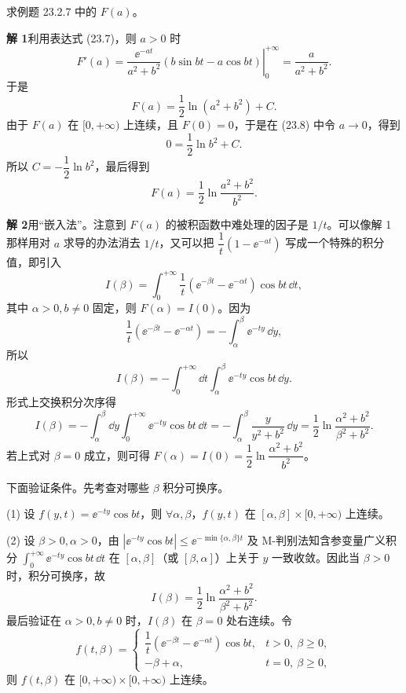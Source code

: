 \begin{xexample}[23.2.8]
求例题 23.2.7 中的 $F(a)$。
\end{xexample}
\begin{xsolution}
\textbf{解 1}\quad 利用表达式 (23.7)，则 $a>0$ 时
\[
  F'(a)=\left.\frac{\ee^{-at}}{a^2+b^2}(b\sin bt-a\cos bt)\right|_0^{+\infty}
  =\frac{a}{a^2+b^2}.
\]
于是
\begin{equation}
  F(a)=\frac12\ln(a^2+b^2)+C.
  \tag{23.8}
\end{equation}
由于 $F(a)$ 在 $[0,+\infty)$ 上连续，且 $F(0)=0$，于是在 (23.8) 中令 $a\to0$，得到
\[
  0=\frac12\ln b^2+C.
\]
所以 $C=-\dfrac12\ln b^2$，最后得到
\[
  F(a)=\frac12\ln\frac{a^2+b^2}{b^2}.
\]

\textbf{解 2}\quad 用“嵌入法”。注意到 $F(a)$ 的被积函数中难处理的因子是 $1/t$。可以像解 1 那样用对 $a$ 求导的办法消去 $1/t$，又可以把 $\dfrac1t(1-\ee^{-at})$ 写成一个特殊的积分值，即引入
\[
  I(\beta)=\int_0^{+\infty}\frac1t(\ee^{-\beta t}-\ee^{-\alpha t})\cos bt\,\dd t,
\]
其中 $\alpha>0,b\neq0$ 固定，则 $F(\alpha)=I(0)$。因为
\[
  \frac1t(\ee^{-\beta t}-\ee^{-\alpha t})=-\int_\alpha^\beta\ee^{-ty}\,\dd y,
\]
所以
\[
  I(\beta)=-\int_0^{+\infty}\dd t\int_\alpha^\beta\ee^{-ty}\cos bt\,\dd y.
\]
形式上交换积分次序得
\[
  I(\beta)=-\int_\alpha^\beta\dd y\int_0^{+\infty}\ee^{-ty}\cos bt\,\dd t
  =-\int_\alpha^\beta\frac{y}{y^2+b^2}\,\dd y
  =\frac12\ln\frac{\alpha^2+b^2}{\beta^2+b^2}.
\]
若上式对 $\beta=0$ 成立，则可得 $F(\alpha)=I(0)=\dfrac12\ln\dfrac{\alpha^2+b^2}{b^2}$。

下面验证条件。先考查对哪些 $\beta$ 积分可换序。

(1) 设 $f(y,t)=\ee^{-ty}\cos bt$，则 $\forall\alpha,\beta$，$f(y,t)$ 在 $[\alpha,\beta]\times[0,+\infty)$ 上连续。

(2) 设 $\beta>0,\alpha>0$，由 $|\ee^{-ty}\cos bt|\leqslant\ee^{-\min\{\alpha,\beta\}t}$ 及 M-判别法知含参变量广义积分 $\displaystyle\int_0^{+\infty}\ee^{-ty}\cos bt\,\dd t$ 在 $[\alpha,\beta]$（或 $[\beta,\alpha]$）上关于 $y$ 一致收敛。因此当 $\beta>0$ 时，积分可换序，故
\[
  I(\beta)=\frac12\ln\frac{\alpha^2+b^2}{\beta^2+b^2}.
\]
最后验证在 $\alpha>0,b\neq0$ 时，$I(\beta)$ 在 $\beta=0$ 处右连续。令
\[
  f(t,\beta)=
  \begin{cases}
    \dfrac1t(\ee^{-\beta t}-\ee^{-\alpha t})\cos bt,&t>0,\ \beta\geqslant0,\\
    -\beta+\alpha,&t=0,\ \beta\geqslant0,
  \end{cases}
\]
则 $f(t,\beta)$ 在 $[0,+\infty)\times[0,+\infty)$ 上连续。


\end{xsolution}
